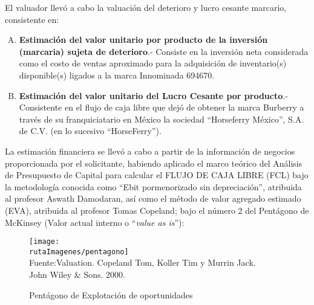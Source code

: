 El valuador llevó a cabo la valuación del deterioro y lucro cesante marcario, consistente en:
\begin{enumerate}[A.]

\item \textbf{\textcolor{principal}{Estimación del valor unitario por producto de la inversión (marcaria) sujeta de deterioro}}.- Consiste en la inversión neta considerada como el costo de ventas aproximado para la adquisición de inventario(s) disponible(s) ligados a la marca Innominada 694670.
\item \textbf{\textcolor{principal}{Estimación del valor unitario del Lucro Cesante por producto}}.- Consistente en el flujo de caja libre que dejó de obtener la marca Burberry a través de su franquiciatario en México la sociedad “Horseferry México”, S.A. de C.V. (en lo sucesivo “HorseFerry”).

\end{enumerate}

La estimación financiera se llevó a cabo a partir de la información de negocios proporcionada por el solicitante, habiendo aplicado el marco teórico del Análisis de Presupuesto de Capital para calcular el FLUJO DE CAJA LIBRE (FCL) bajo la metodología conocida como ``Ebit pormenorizado sin depreciación'', atribuida al profesor Aswath Damodaran, así como el método de valor agregado estimado (EVA), atribuida al profesor Tomas Copeland; bajo el número 2 del Pentágono de McKinsey (Valor actual interno o ``\textit{value as is}''):

\begin{figure}[H]
\centering
\caption{Pent\'agono de Explotaci\'on de oportunidades\label{fig:hexagono}}
\texttt{[image: \\rutaImagenes/pentagono]}\\
Fuente:Valuation. Copeland Tom, Koller Tim y Murrin Jack.\\

John Wiley \& Sons. 2000.
\end{figure}
